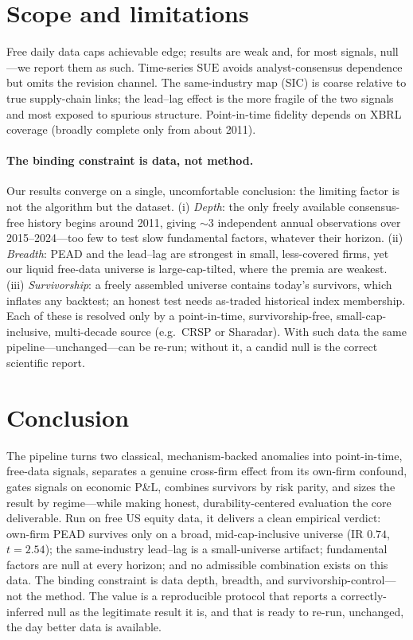\documentclass[11pt,a4paper]{article}
\theoremstyle{plain}
\theoremstyle{definition}
\newcommand{\SUE}{\mathrm{SUE}}
\begin{document}
\section{Scope and limitations}
\label{sec:scope}
Free daily data caps achievable edge; results are weak and, for most signals, null---we report them
as such. Time-series $\SUE$ avoids analyst-consensus dependence but omits the revision channel. The
same-industry map (SIC) is coarse relative to true supply-chain links; the lead--lag effect is the
more fragile of the two signals and most exposed to spurious structure. Point-in-time fidelity
depends on XBRL coverage (broadly complete only from about 2011).

\paragraph{The binding constraint is data, not method.} Our results converge on a single,
uncomfortable conclusion: the limiting factor is not the algorithm but the dataset. (i) \emph{Depth}:
the only freely available consensus-free history begins around 2011, giving $\sim 3$ independent
annual observations over 2015--2024---too few to test slow fundamental factors, whatever their
horizon. (ii) \emph{Breadth}: PEAD and the lead--lag are strongest in small, less-covered firms, yet
our liquid free-data universe is large-cap-tilted, where the premia are weakest. (iii)
\emph{Survivorship}: a freely assembled universe contains today's survivors, which inflates any
backtest; an honest test needs as-traded historical index membership. Each of these is resolved only
by a point-in-time, survivorship-free, small-cap-inclusive, multi-decade source (e.g.\ CRSP or
Sharadar). With such data the same pipeline---unchanged---can be re-run; without it, a candid null is
the correct scientific report.

\section{Conclusion}
\label{sec:conclusion}
The pipeline turns two classical, mechanism-backed anomalies into point-in-time, free-data signals,
separates a genuine cross-firm effect from its own-firm confound, gates signals on economic P\&L,
combines survivors by risk parity, and sizes the result by regime---while making honest,
durability-centered evaluation the core deliverable. Run on free US equity data, it delivers a
clean empirical verdict: own-firm PEAD survives only on a broad, mid-cap-inclusive universe
(IR $0.74$, $t=2.54$); the same-industry lead--lag is a small-universe artifact; fundamental factors
are null at every horizon; and no admissible combination exists on this data. The binding constraint
is data depth, breadth, and survivorship-control---not the method. The value is a reproducible
protocol that reports a correctly-inferred null as the legitimate result it is, and that is ready to
re-run, unchanged, the day better data is available.
\end{document}
